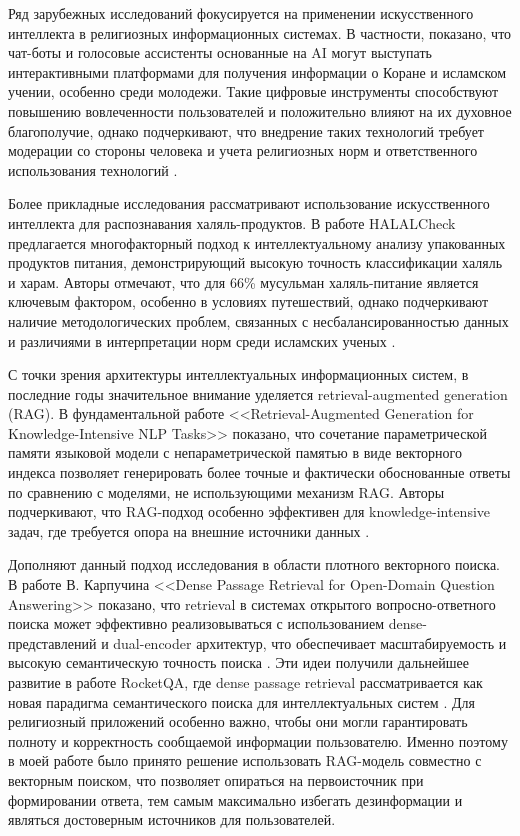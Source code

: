 Ряд зарубежных исследований фокусируется на применении искусственного интеллекта в религиозных информационных системах. В частности, показано, что чат-боты и голосовые ассистенты основанные на AI могут выступать интерактивными платформами для получения информации о Коране и исламском учении, особенно среди молодежи. Такие цифровые инструменты способствуют повышению вовлеченности пользователей и положительно влияют на их духовное благополучие, однако подчеркивают, что внедрение таких технологий требует модерации со стороны человека и учета религиозных норм и ответственного использования технологий \cite{ref12}.


Более прикладные исследования рассматривают использование искусственного интеллекта для распознавания халяль-продуктов. В работе HALALCheck предлагается многофакторный подход к интеллектуальному анализу упакованных продуктов питания, демонстрирующий высокую точность классификации халяль и харам. Авторы отмечают, что для 66\% мусульман халяль-питание является ключевым фактором, особенно в условиях путешествий, однако подчеркивают наличие методологических проблем, связанных с несбалансированностью данных и различиями в интерпретации норм среди исламских ученых \cite{ref13}.


С точки зрения архитектуры интеллектуальных информационных систем, в последние годы значительное внимание уделяется retrieval-augmented generation (RAG). В фундаментальной работе <<Retrieval-Augmented Generation for Knowledge-Intensive NLP Tasks>> показано, что сочетание параметрической памяти языковой модели с непараметрической памятью в виде векторного индекса позволяет генерировать более точные и фактически обоснованные ответы по сравнению с моделями, не использующими механизм RAG. Авторы подчеркивают, что RAG-подход особенно эффективен для knowledge-intensive задач, где требуется опора на внешние источники данных \cite{ref14}.


Дополняют данный подход исследования в области плотного векторного поиска. В работе В. Карпучина <<Dense Passage Retrieval for Open-Domain Question Answering>> показано, что retrieval в системах открытого вопросно-ответного поиска может эффективно реализовываться с использованием dense-представлений и dual-encoder архитектур, что обеспечивает масштабируемость и высокую семантическую точность поиска \cite{ref15}. Эти идеи получили дальнейшее развитие в работе RocketQA, где dense passage retrieval рассматривается как новая парадигма семантического поиска для интеллектуальных систем \cite{ref16}. Для религиозный приложений особенно важно, чтобы они могли гарантировать полноту и корректность сообщаемой информации пользователю. Именно поэтому в моей работе было принято решение использовать RAG-модель совместно с векторным поиском, что позволяет опираться на первоисточник при формировании ответа, тем самым максимально избегать дезинформации и являться достоверным источников для пользователей.


